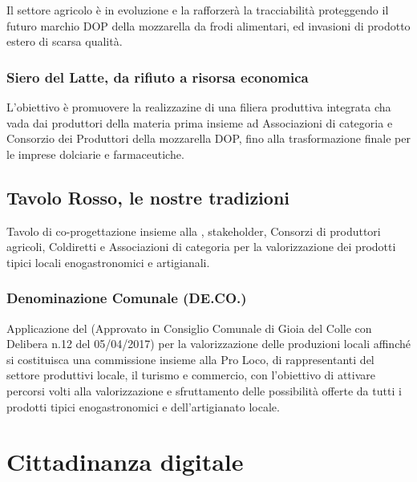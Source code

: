 \documentclass[a4paper,14pt,italian]{sphinxmanual}
\begin{document}
Il settore agricolo è in evoluzione e la  rafforzerà la tracciabilità proteggendo il futuro marchio DOP della mozzarella da frodi alimentari, ed invasioni di prodotto estero di scarsa qualità.


\subsection{Siero del Latte, da rifiuto a risorsa economica}
\label{\detokenize{agricoltura:siero-del-latte-da-rifiuto-a-risorsa-economica}}
L’obiettivo è promuovere la realizzazine di una filiera produttiva integrata cha vada dai produttori della materia prima insieme ad Associazioni di categoria e Consorzio dei Produttori della mozzarella DOP, fino alla trasformazione finale per le imprese dolciarie e farmaceutiche.


\section{Tavolo Rosso, le nostre tradizioni}
\label{\detokenize{agricoltura:tavolo-rosso-le-nostre-tradizioni}}
Tavolo di co-progettazione insieme alla , stakeholder, Consorzi di produttori agricoli, Coldiretti e Associazioni di categoria per la valorizzazione dei prodotti tipici locali enogastronomici e artigianali.


\subsection{Denominazione Comunale (DE.CO.)}
\label{\detokenize{agricoltura:denominazione-comunale-de-co}}
Applicazione del  (Approvato in Consiglio Comunale di Gioia del Colle con Delibera n.12 del 05/04/2017) per la valorizzazione delle produzioni locali affinché si costituisca una commissione insieme alla Pro Loco, di rappresentanti del settore produttivi locale, il turismo e commercio, con l’obiettivo di attivare percorsi volti alla valorizzazione e sfruttamento delle possibilità offerte da tutti i prodotti tipici enogastronomici e dell’artigianato locale.


\chapter{Cittadinanza digitale}
\label{\detokenize{digitale:cittadinanza-digitale}}\label{\detokenize{digitale::doc}}
\end{document}

